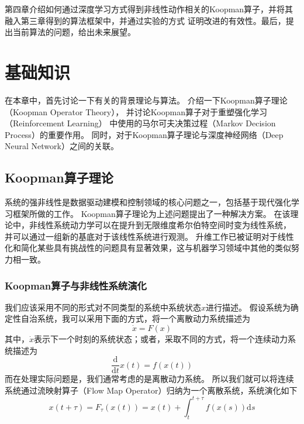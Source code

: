 \documentclass[AutoFakeBold]{LZUThesis}
\begin{document}
第四章介绍如何通过深度学习方式得到非线性动作相关的Koopman算子，并将其融入第三章得到的算法框架中，并通过实验的方式
证明改进的有效性。最后，提出当前算法的问题，给出未来展望。


\chapter{基础知识}
在本章中，首先讨论一下有关的背景理论与算法。
介绍一下Koopman算子理论（Koopman Operator Theory），
并讨论Koopman算子对于重塑强化学习（Reinforcement Learning）
中使用的马尔可夫决策过程（Markov Decision Process）的重要作用。
同时，对于Koopman算子理论与深度神经网络（Deep Neural Network）之间的关联。

\section{Koopman算子理论}
系统的强非线性是数据驱动建模和控制领域的核心问题之一，包括基于现代强化学习框架所做的工作。
Koopman算子理论\cite{koopman_dynamical_1932}为上述问题提出了一种解决方案。
在该理论中，非线性系统动力学可以在提升到无限维度希尔伯特空间时变为线性系统，
并可以通过一组新的基底对于该线性系统进行观测。
升维工作已被证明对于线性化和简化某些具有挑战性的问题具有显著效果，这与机器学习领域中其他的类似努力相一致。

\subsection{Koopman算子与非线性系统演化}
我们应该采用不同的形式对不同类型的系统中系统状态$x$进行描述。
假设系统为确定性自治系统，我可以采用下面的方式，将一个离散动力系统描述为
\begin{equation}
  \dot{x} = F(x)
\end{equation}
其中，$\Dot{x}$表示下一个时刻的系统状态；或者，采取不同的方式，将一个连续动力系统描述为
\begin{equation}
  \frac{\mathrm{d}}{\mathrm{d}t} x(t) = f(x(t))
\end{equation}
而在处理实际问题是，我们通常考虑的是离散动力系统。
所以我们就可以将连续系统通过流映射算子（Flow Map Operator）归纳为一个离散系统，系统演化如下
\begin{equation}
  x(t + \tau) = F_\tau(x(t)) = x(t) + \int^{t + \tau}_t f(x(s)) \mathrm{d}s
\end{equation}
\end{document}

